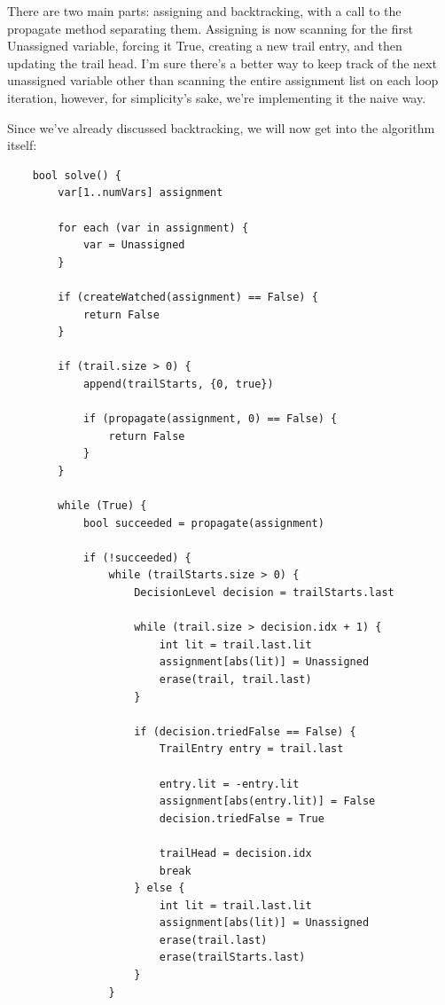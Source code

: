\documentclass[../main.tex]{subfiles}
\begin{document}
There are two main parts: assigning and backtracking, with a call to the propagate 
method separating them. Assigning is now scanning for the first Unassigned variable,
forcing it True, creating a new trail entry, and then updating the trail head. I'm 
sure there's a better way to keep track of the next unassigned variable other than 
scanning the entire assignment list on each loop iteration, however, for simplicity's 
sake, we're implementing it the naive way. 

Since we've already discussed backtracking, we will now get into the algorithm 
itself:

\begin{lstlisting}
    bool solve() {
        var[1..numVars] assignment

        for each (var in assignment) {
            var = Unassigned
        }

        if (createWatched(assignment) == False) {
            return False
        }

        if (trail.size > 0) {
            append(trailStarts, {0, true})

            if (propagate(assignment, 0) == False) {
                return False
            }
        }

        while (True) {
            bool succeeded = propagate(assignment)

            if (!succeeded) {
                while (trailStarts.size > 0) {
                    DecisionLevel decision = trailStarts.last

                    while (trail.size > decision.idx + 1) {
                        int lit = trail.last.lit
                        assignment[abs(lit)] = Unassigned
                        erase(trail, trail.last)
                    }

                    if (decision.triedFalse == False) {
                        TrailEntry entry = trail.last

                        entry.lit = -entry.lit
                        assignment[abs(entry.lit)] = False
                        decision.triedFalse = True

                        trailHead = decision.idx
                        break
                    } else {
                        int lit = trail.last.lit
                        assignment[abs(lit)] = Unassigned
                        erase(trail.last)
                        erase(trailStarts.last)
                    }
                }


\end{lstlisting}
\end{document}
